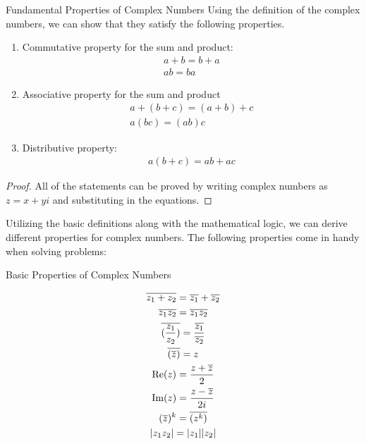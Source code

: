 \begin{propbox}{Fundamental Properties of Complex Numbers}
	Using the definition of the complex numbers, we can show that they satisfy the following properties. \\
	
	\begin{enumerate}
	
		\item Commutative property for the sum and product: 
		\begin{gather}
		a + b = b + a \\
		ab = ba
		\end{gather}
		
		\item Associative property for the sum and product
		\begin{gather}
		a + (b+c) = (a+b) + c \\
		a(bc) = (ab)c
		\end{gather}
		
		\item Distributive property:
		\begin{gather}
		a (b+c) = ab + ac
		\end{gather}
	
	\end{enumerate}
\end{propbox}

\begin{proof}
	All of the statements can be proved by writing complex numbers as $z = x+yi$ and substituting in the equations.
\end{proof}

Utilizing the basic definitions along with the mathematical logic, we can derive different properties for complex numbers. The following properties come in handy when solving problems:

\begin{propbox}{Basic Properties of Complex Numbers}
	
	\begin{gather}
	\overline{z_1 + z_2} = \overline{z_1} + \overline{z_2} \\
	\overline{z_1 z_2} = \overline{z_1} \overline{z_2} \\
	\overline{(\frac{z_1}{z_2})} = \frac{\overline{z_1}}{\overline{z_2}}  \\
	\overline{(\overline{z})} = z \\
	\operatorname{Re}(z) = \frac{z + \overline{z}}{2} \\
	\operatorname{Im}(z) = \frac{z - \overline{z}}{2i} \\
	(\overline{z})^k = \overline{(z^k)} \\  
	|z_1 z_2| = |z_1||z_2|
	\end{gather}

\end{propbox}

